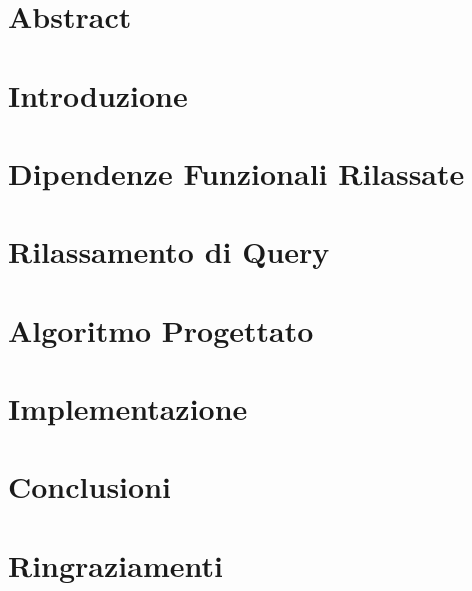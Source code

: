 \documentclass[12pt,oneside]{report}
\begin{document}
\begin{titlepage}

\end{titlepage}



\chapter*{Abstract}

\tableofcontents
\listoftables
\renewcommand\listoflistingscaption{Elenco degli snippet di codice}
\listoflistings



\chapter{Introduzione}


\chapter{Dipendenze Funzionali Rilassate}


\chapter{Rilassamento di Query}


\chapter{Algoritmo Progettato}


\chapter{Implementazione}


\chapter{Conclusioni}





\chapter*{Ringraziamenti}

\end{document}
